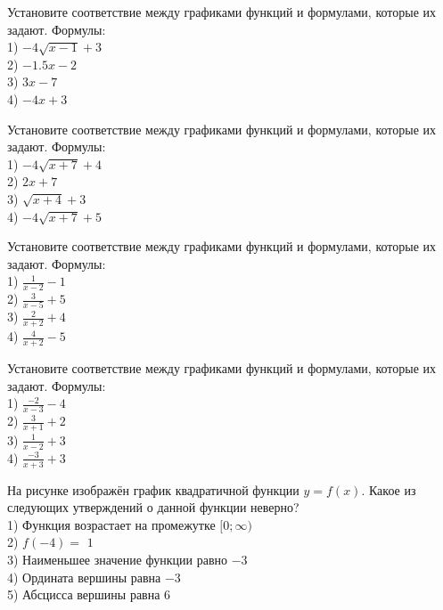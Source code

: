 \documentclass[4apaper]{article}
\begin{document}
\begin{taskBN}{16}
Установите соответствие между графиками функций и формулами, которые их задают. Формулы: \\1) $-4\sqrt{x-1}+3$\\2) $-1.5x-2$\\3) $3x-7$\\4) $-4x+3$
\end{taskBN}

\begin{taskBN}{17}
Установите соответствие между графиками функций и формулами, которые их задают. Формулы: \\1) $-4\sqrt{x+7}+4$\\2) $2x+7$\\3) $\sqrt{x+4}+3$\\4) $-4\sqrt{x+7}+5$
\end{taskBN}

\begin{taskBN}{18}
Установите соответствие между графиками функций и формулами, которые их задают. Формулы: \\1) $\frac{1}{x-2}-1$\\2) $\frac{3}{x-5}+5$\\3) $\frac{2}{x+2}+4$\\4) $\frac{4}{x+2}-5$
\end{taskBN}

\begin{taskBN}{19}
Установите соответствие между графиками функций и формулами, которые их задают. Формулы: \\1) $\frac{-2}{x-3}-4$\\2) $\frac{3}{x+1}+2$\\3) $\frac{1}{x-2}+3$\\4) $\frac{-3}{x+3}+3$
\end{taskBN}

\begin{taskBN}{20}
На рисунке изображён график квадратичной функции $y=f(x)$. Какое из следующих утверждений о данной функции неверно?\\1) Функция возрастает на промежутке $[0; \infty)$\\2) $f(-4)=$ $1$\\3) Наименьшее значение функции равно  $-3$\\4) Ордината вершины равна $-3$\\5) Абсцисса вершины равна $6$
\end{taskBN}
\end{document}
